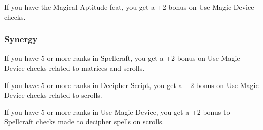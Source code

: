 If you have the Magical Aptitude feat, you get a +2 bonus on Use Magic Device checks.
\subsubsection{Synergy}
\begin{list}{}{\leftmargin=1em}
\item If you have 5 or more ranks in Spellcraft, you get a +2 bonus on Use Magic Device checks related to matrices and scrolls.
\item If you have 5 or more ranks in Decipher Script, you get a +2 bonus on Use Magic Device checks related to scrolls.
\item If you have 5 or more ranks in Use Magic Device, you get a +2 bonus to Spellcraft checks made to decipher spells on scrolls.
\end{list}